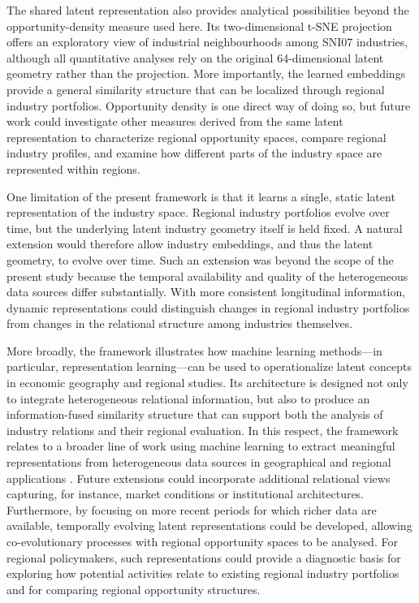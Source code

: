 \documentclass[9pt,twocolumn,twoside]{pnas-new}
\begin{document}
The shared latent representation also provides analytical possibilities beyond the opportunity-density measure used here. Its two-dimensional t-SNE projection offers an exploratory view of industrial neighbourhoods among SNI07 industries, although all quantitative analyses rely on the original 64-dimensional latent geometry rather than the projection. More importantly, the learned embeddings provide a general similarity structure that can be localized through regional industry portfolios. Opportunity density is one direct way of doing so, but future work could investigate other measures derived from the same latent representation to characterize regional opportunity spaces, compare regional industry profiles, and examine how different parts of the industry space are represented within regions.

One limitation of the present framework is that it learns a single, static latent representation of the industry space. Regional industry portfolios evolve over time, but the underlying latent industry geometry itself is held fixed. A natural extension would therefore allow industry embeddings, and thus the latent geometry, to evolve over time. Such an extension was beyond the scope of the present study because the temporal availability and quality of the heterogeneous data sources differ substantially. With more consistent longitudinal information, dynamic representations could distinguish changes in regional industry portfolios from changes in the relational structure among industries themselves.

More broadly, the framework illustrates how machine learning methods---in particular, representation learning---can be used to operationalize latent concepts in economic geography and regional studies. Its architecture is designed not only to integrate heterogeneous relational information, but also to produce an information-fused similarity structure that can support both the analysis of industry relations and their regional evaluation. In this respect, the framework relates to a broader line of work using machine learning to extract meaningful representations from heterogeneous data sources in geographical and regional applications \citep[see also][]{astromEnhancingCarbonEmission2025}. Future extensions could incorporate additional relational views capturing, for instance, market conditions or institutional architectures. Furthermore, by focusing on more recent periods for which richer data are available, temporally evolving latent representations could be developed, allowing co-evolutionary processes with regional opportunity spaces to be analysed. For regional policymakers, such representations could provide a diagnostic basis for exploring how potential activities relate to existing regional industry portfolios and for comparing regional opportunity structures.
\end{document}

